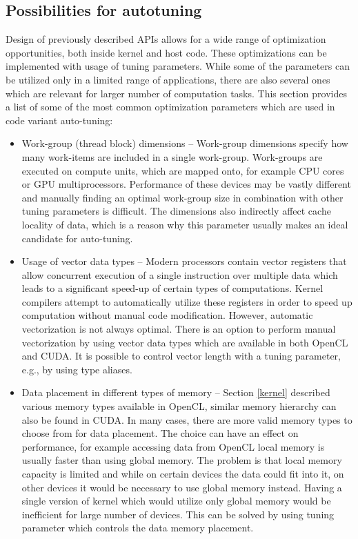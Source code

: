 \documentclass[
  digital,     %
  oneside,     %
  nosansbold,  %
  nocolorbold, %
  lof,         %
  lot,         %
  nocover
]{fithesis4}
\begin{document}
\subsection{Possibilities for autotuning}
Design of previously described APIs allows for a wide range of optimization opportunities, both inside kernel and host code. These optimizations can be implemented with usage of tuning parameters. While some of the parameters can be utilized only in a limited range of applications, there are also several ones which are relevant for larger number of computation tasks. This section provides a list of some of the most common optimization parameters which are used in code variant auto-tuning:

\begin{itemize}
	\item Work-group (thread block) dimensions -- Work-group dimensions specify how many work-items are included in a single work-group. Work-groups are executed on compute units, which are mapped onto, for example CPU cores or GPU multiprocessors. Performance of these devices may be vastly different and manually finding an optimal work-group size in combination with other tuning parameters is difficult. The dimensions also indirectly affect cache locality of data, which is a reason why this parameter usually makes an ideal candidate for auto-tuning.
	\item Usage of vector data types -- Modern processors contain vector registers that allow concurrent execution of a single instruction over multiple data which leads to a significant speed-up of certain types of computations. Kernel compilers attempt to automatically utilize these registers in order to speed up computation without manual code modification. However, automatic vectorization is not always optimal. There is an option to perform manual vectorization by using vector data types which are available in both OpenCL and CUDA. It is possible to control vector length with a tuning parameter, e.g., by using type aliases.
	\item Data placement in different types of memory -- Section \ref{kernel} described various memory types available in OpenCL, similar memory hierarchy can also be found in CUDA. In many cases, there are more valid memory types to choose from for data placement. The choice can have an effect on performance, for example accessing data from OpenCL local memory is usually faster than using global memory. The problem is that local memory capacity is limited and while on certain devices the data could fit into it, on other devices it would be necessary to use global memory instead. Having a single version of kernel which would utilize only global memory would be inefficient for large number of devices. This can be solved by using tuning parameter which controls the data memory placement.
\end{itemize}
\end{document}
